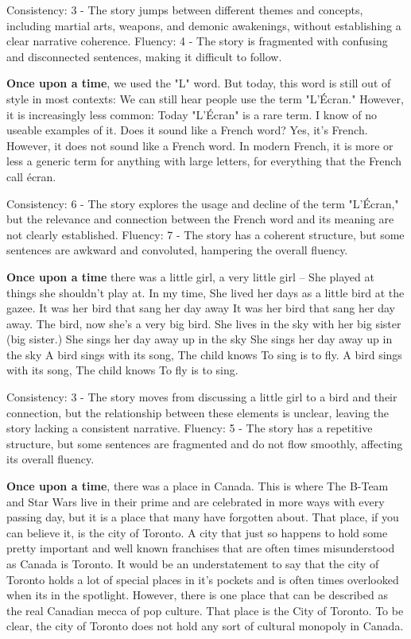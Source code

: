 \documentclass{article}
\begin{document}
Consistency: 3 - The story jumps between different themes and concepts, including martial arts, weapons, and demonic awakenings, without establishing a clear narrative coherence.
Fluency: 4 - The story is fragmented with confusing and disconnected sentences, making it difficult to follow.

\textbf{Once upon a time}, we used the "L" word. But today, this word is still out of style in most contexts: We can still hear people use the term "L'Écran." However, it is increasingly less common: Today "L'Écran" is a rare term. I know of no useable examples of it. Does it sound like a French word?  Yes, it's French. However, it does not sound like a French word. In modern French, it is more or less a generic term for anything with large letters, for everything that the French call écran.

Consistency: 6 - The story explores the usage and decline of the term "L'Écran," but the relevance and connection between the French word and its meaning are not clearly established.
Fluency: 7 - The story has a coherent structure, but some sentences are awkward and convoluted, hampering the overall fluency.

\textbf{Once upon a time} there was a little girl, a very little girl – She played at things she shouldn't play at. In my time, She lived her days as a little bird at the gazee. It was her bird that sang her day away It was her bird that sang her day away. The bird, now she's a very big bird. She lives in the sky with her big sister (big sister.) She sings her day away up in the sky She sings her day away up in the sky  A bird sings with its song, The child knows To sing is to fly. A bird sings with its song, The child knows To fly is to sing.

Consistency: 3 - The story moves from discussing a little girl to a bird and their connection, but the relationship between these elements is unclear, leaving the story lacking a consistent narrative.
Fluency: 5 - The story has a repetitive structure, but some sentences are fragmented and do not flow smoothly, affecting its overall fluency.

\textbf{Once upon a time}, there was a place in Canada. This is where The B-Team and Star Wars live in their prime and are celebrated in more ways with every passing day, but it is a place that many have forgotten about. That place, if you can believe it, is the city of Toronto. A city that just so happens to hold some pretty important and well known franchises that are often times misunderstood as Canada is Toronto. It would be an understatement to say that the city of Toronto holds a lot of special places in it's pockets and is often times overlooked when its in the spotlight. However, there is one place that can be described as the real Canadian mecca of pop culture. That place is the City of Toronto. To be clear, the city of Toronto does not hold any sort of cultural monopoly in Canada.
\end{document}
